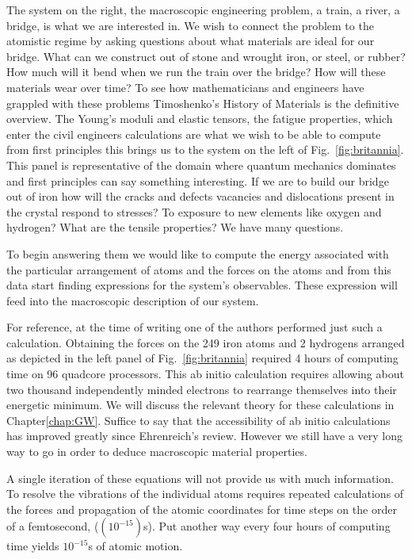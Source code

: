 The system on the right, the macroscopic engineering problem, a train, a river, a bridge, is what we
are interested in. We wish to connect the problem to the atomistic regime by asking questions about
what materials are ideal for our bridge. What can we construct out of stone and wrought iron, or steel,
or rubber? How much will it bend when we run the train over the bridge? How will these materials wear over time?
To see how mathematicians and engineers have grappled with these problems Timoshenko's 
History of Materials is the definitive overview. The Young's moduli and elastic tensors, the fatigue properties,
which enter the civil engineers calculations are what we wish to be able to compute from first principles
this brings us to the system on the left of Fig.~\ref{fig:britannia}. This panel is representative of the domain 
where quantum mechanics dominates and first principles can say something interesting. If we are to build
our bridge out of iron how will the cracks and defects vacancies and dislocations present in the crystal
respond to stresses? To exposure to new elements like oxygen and hydrogen? What are the tensile properties?
We have many questions.

To begin answering them we would like to compute the energy associated with the particular 
arrangement of atoms and the forces on the atoms and from this data start finding expressions
for the system's observables. These expression will feed into the macroscopic description of our system.

For reference, at the time of writing one of the authors performed just such a calculation. Obtaining  
the forces on the 249 iron atoms and 2 hydrogens arranged as depicted in the left panel of 
Fig.~\ref{fig:britannia} required 4 hours of computing time on 96 quadcore processors.
This ab initio calculation requires allowing about two thousand independently minded electrons
to rearrange themselves into their energetic minimum. We will discuss the relevant
theory for these calculations in Chapter\ref{chap:GW}. Suffice to say that the accessibility
of ab initio calculations has improved greatly since Ehrenreich's review.
However we still have a very long way to go in order to deduce macroscopic material properties.

A single iteration of these equations will not provide us with 
much information. To resolve the vibrations of the individual atoms  
requires repeated calculations of the forces and propagation of the atomic coordinates
for time steps on the order of a femtosecond, ($(10^{-15})$s).
Put another way every four hours of computing time yields $10^{-15}$s
of atomic motion.

